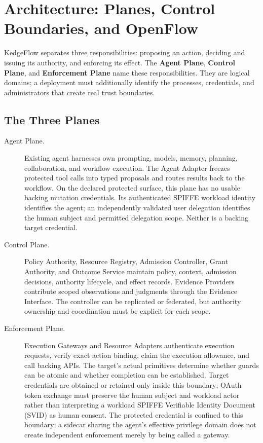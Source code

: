 \section{Architecture: Planes, Control Boundaries, and OpenFlow}
\label{sec:architecture}

KedgeFlow separates three responsibilities: proposing an action, deciding and issuing its authority, and enforcing its effect. The \textbf{Agent Plane}, \textbf{Control Plane}, and \textbf{Enforcement Plane} name these responsibilities. They are logical domains; a deployment must additionally identify the processes, credentials, and administrators that create real trust boundaries.

\subsection{The Three Planes}
\begin{description}
\item[Agent Plane.] Existing agent harnesses own prompting, models, memory, planning, collaboration, and workflow execution. The Agent Adapter freezes protected tool calls into typed proposals and routes results back to the workflow. On the declared protected surface, this plane has no usable backing mutation credentials. Its authenticated SPIFFE workload identity identifies the agent; an independently validated user delegation identifies the human subject and permitted delegation scope. Neither is a backing target credential.
\item[Control Plane.] Policy Authority, Resource Registry, Admission Controller, Grant Authority, and Outcome Service maintain policy, context, admission decisions, authority lifecycle, and effect records. Evidence Providers contribute scoped observations and judgments through the Evidence Interface. The controller can be replicated or federated, but authority ownership and coordination must be explicit for each scope.
\item[Enforcement Plane.] Execution Gateways and Resource Adapters authenticate execution requests, verify exact action binding, claim the execution allowance, and call backing APIs. The target's actual primitives determine whether guards can be atomic and whether completion can be established. Target credentials are obtained or retained only inside this boundary; OAuth token exchange must preserve the human subject and workload actor rather than interpreting a workload SPIFFE Verifiable Identity Document (SVID) as human consent. The protected credential is confined to this boundary; a sidecar sharing the agent's effective privilege domain does not create independent enforcement merely by being called a gateway.
\end{description}

